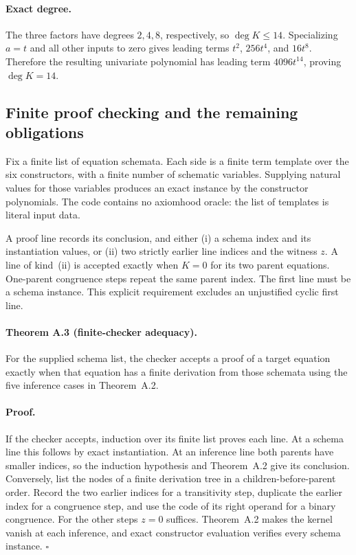 \paragraph{Exact degree.}
The three factors have degrees $2,4,8$, respectively, so
$\deg K\leq14$.  Specializing $a=t$ and all other inputs to zero gives
leading terms $t^2$, $256t^4$, and $16t^8$.  Therefore the resulting
univariate polynomial has leading term $4096t^{14}$, proving
$\deg K=14$.

\subsection{Finite proof checking and the remaining obligations}

Fix a finite list of equation schemata.  Each side is a finite term
template over the six constructors, with a finite number of schematic
variables.  Supplying natural values for those variables produces an
exact instance by the constructor polynomials.  The code contains no
axiomhood oracle: the list of templates is literal input data.

A proof line records its conclusion, and either (i) a schema index and
its instantiation values, or (ii) two strictly earlier line indices and
the witness $z$.  A line of kind~(ii) is accepted exactly when $K=0$ for
its two parent equations.  One-parent congruence steps repeat the same
parent index.  The first line must be a schema instance.  This explicit
requirement excludes an unjustified cyclic first line.

\paragraph{Theorem A.3 (finite-checker adequacy).}
For the supplied schema list, the checker accepts a proof of a target
equation exactly when that equation has a finite derivation from those
schemata using the five inference cases in Theorem~A.2.

\paragraph{Proof.}
If the checker accepts, induction over its finite list proves each line.
At a schema line this follows by exact instantiation.  At an inference
line both parents have smaller indices, so the induction hypothesis and
Theorem~A.2 give its conclusion.  Conversely, list the nodes of a finite
derivation tree in a children-before-parent order.  Record the two
earlier indices for a transitivity step, duplicate the earlier index
for a congruence step, and use the code of its right operand for a binary
congruence.  For the other steps $z=0$ suffices.  Theorem~A.2 makes the
kernel vanish at each inference, and exact constructor evaluation
verifies every schema instance. \hfill$\square$

